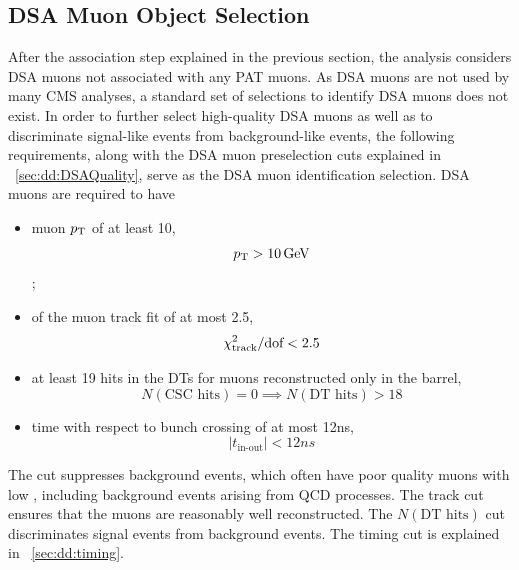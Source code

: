 \subsection{DSA Muon Object Selection}
\label{sec:dd:DSAObject}
After the \DSAToPAT association step explained in the previous section, the analysis considers DSA muons not associated with any PAT muons.
As DSA muons are not used by many CMS analyses, a standard set of selections to identify DSA muons does not exist.
In order to further select high-quality DSA muons as well as to discriminate signal-like events from background-like events, the following requirements, along with the DSA muon preselection cuts explained in \Sec~\ref{sec:dd:DSAQuality}, serve as the DSA muon identification selection.
DSA muons are required to have
\begin{itemize}
  \item muon $p_{\mathrm{T}}$ of at least 10\GeV, \ie $$p_{\mathrm{T}} > 10\,\text{Ge\hspace{-.08em}V}$$;
  \item \normchisq of the muon track fit of at most 2.5, \ie $$\chi^{2}_\text{track}/\text{dof} < 2.5$$
  \item at least 19 hits in the DTs for muons reconstructed only in the barrel, \ie $$N(\text{CSC hits}) = 0 \implies N(\text{DT hits}) > 18$$
  \item time with respect to bunch crossing of at most 12\unit{ns}, \ie $$|t_\text{in-out}| < 12\unit{ns}$$
\end{itemize}

The \pT cut suppresses background events, which often have poor quality muons with low \pT, including background events arising from QCD processes.
The track \normchisq cut ensures that the muons are reasonably well reconstructed.
The $N(\text{DT hits})$ cut discriminates signal events from background events.
The timing cut is explained in \Sec~\ref{sec:dd:timing}.

\pagebreak
